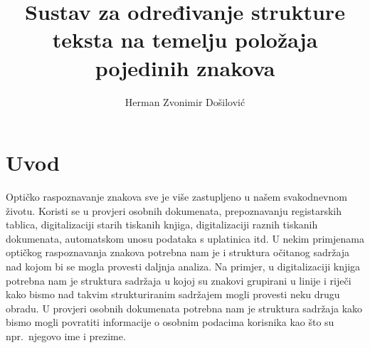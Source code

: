 \documentclass[times, utf8, zavrsni]{fer}
\begin{document}


\title{
    Sustav za određivanje strukture teksta na temelju položaja pojedinih znakova
}

\author{Herman Zvonimir Došilović}

\maketitle




\tableofcontents
















\chapter{Uvod}
Optičko raspoznavanje znakova sve je više zastupljeno u našem svakodnevnom
životu. Koristi se u provjeri osobnih dokumenata, prepoznavanju registarskih
tablica, digitalizaciji starih tiskanih knjiga, digitalizaciji raznih tiskanih
dokumenata, automatskom unosu podataka s uplatinica itd. U nekim primjenama
optičkog raspoznavanja znakova potrebna nam je i struktura očitanog sadržaja
nad kojom bi se mogla provesti daljnja analiza. Na primjer, u digitalizaciji
knjiga potrebna nam je struktura sadržaja u kojoj su znakovi grupirani u linije
i riječi kako bismo nad takvim strukturiranim sadržajem mogli provesti neku
drugu obradu. U provjeri osobnih dokumenata potrebna nam je struktura sadržaja
kako bismo mogli povratiti informacije o osobnim podacima korisnika kao što su
npr.\ njegovo ime i prezime.
\end{document}
